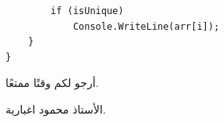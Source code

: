 \documentclass[14pt]{extarticle}
\begin{document}
\begin{enumerate}[itemsep=3em]
\begin{boxSolution}
\begin{english}
\begin{verbatim}
        if (isUnique)
            Console.WriteLine(arr[i]);
    }
}
\end{verbatim}
\end{english}
\end{boxSolution}
\fi

\end{enumerate}

\vspace{1cm}
\begin{flushleft}
أرجو لكم وقتًا ممتعًا.

الأستاذ محمود اغبارية.
\end{flushleft}
\end{document}

